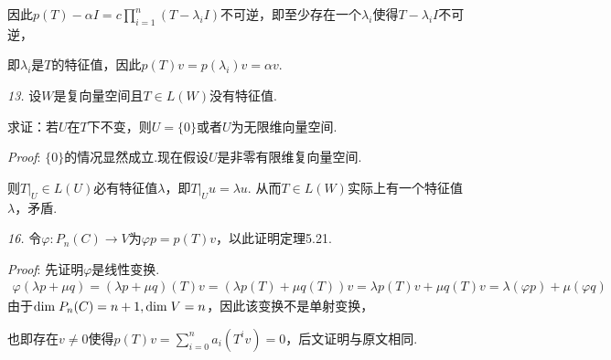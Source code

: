 因此$p(T)-\alpha I=c\prod_{i=1}^n (T-\lambda_i I)$不可逆，即至少存在一个$\lambda_i$使得$T-\lambda_i I$不可逆，

即$\lambda_i$是$T$的特征值，因此$p(T)v=p(\lambda_i)v=\alpha v$.

\hspace*{\fill}

\textit{13.}
设$W$是复向量空间且$T \in L(W)$没有特征值.

求证：若$U$在$T$下不变，则$U=\{0\}$或者$U$为无限维向量空间.

\textit{Proof}:
$\{0\}$的情况显然成立.现在假设$U$是非零有限维复向量空间.

则$T|_U \in L(U)$必有特征值$\lambda$，即$T|_U u=\lambda u$.
从而$T \in L(W)$实际上有一个特征值$\lambda$，矛盾.

\hspace*{\fill}

\textit{16.}
令$\varphi:P_n(C) \rightarrow V$为$\varphi p=p(T)v$，以此证明定理5.21.

\textit{Proof}:
先证明$\varphi$是线性变换.
    \begin{align*}
        \varphi(\lambda p+\mu q)=(\lambda p+\mu q)(T)v=(\lambda p(T)+\mu q(T))v
        =\lambda p(T)v+\mu q(T)v=\lambda(\varphi p)+\mu(\varphi q)
    \end{align*}
由于$\mathrm{dim \;} P_n(C)=n+1,\mathrm{dim \;} V=n$，因此该变换不是单射变换，

也即存在$v \ne 0$使得$p(T)v=\sum_{i=0}^n a_i(T^iv)=0$，后文证明与原文相同.

